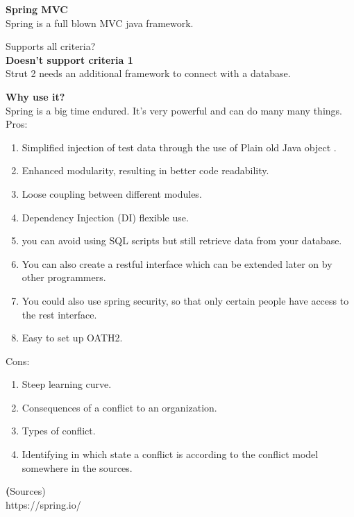 \textbf{Spring MVC} \\
Spring is a full blown MVC java framework.

Supports all criteria? \\
\textbf{Doesn't support criteria 1}\\
Strut 2 needs an additional framework  to connect with a database.

\textbf{Why use it?}\\
Spring is a big time endured. It's very powerful and can do many many things.\\

Pros:
\begin{enumerate}
	\item Simplified injection of test data through the use of Plain old Java object .
	\item Enhanced modularity, resulting in better code readability.
	\item Loose coupling between different modules.
	\item Dependency Injection (DI) flexible use.
	\item you can avoid using SQL scripts but still retrieve data from your database.
	\item You can also create a restful interface which can be extended later on by other programmers.
	\item You could also use spring security, so that only certain people have access to the rest interface.
	\item Easy to set up OATH2. 
\end{enumerate}
Cons:
\begin{enumerate}
	\item Steep learning curve.
	\item Consequences of a conflict to an organization.
	\item Types of conflict.
	\item Identifying in which state a conflict is according to the conflict model somewhere in the sources.
\end{enumerate}

\textbf(Sources)\\
https://spring.io/